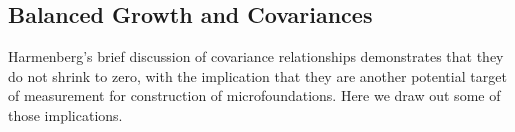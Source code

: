 \documentclass[BufferStockTheory]{subfiles}
\begin{document}
\hypertarget{Balanced-Growth-Of-Covariances}{}
\subsection{Balanced Growth and Covariances}\label{subsec:Covariances}

\begin{comment}
From the perspective of period $t$, %
\begin{align*}
\BLevBF_{t+1} & = \Mean[b_{t+1} \pLevBF_{t+1}]
\\              & = \PGro \Mean[\cRat_{t}(\Rfree/(\PGro\pShk_{t+1}))\pShk_{t+1}\pLevBF_{t}]
\\              & = \PGro \Mean[\cRat_{t}\Rnorm\pLevBF_{t}]
\\              & = \PGro \Mean[(\mRat_{t}-\cFunc(\mRat_{t}))\Rnorm\pLevBF_{t}]
\\              & = \PGro \Mean[(\bRat_{t}+\tShk_{t}-\cFunc(\bRat_{t}+\tShk_{t}))\Rnorm\pLevBF_{t}]
\end{align*}
\end{comment}

Harmenberg's brief discussion of covariance relationships demonstrates that they do not shrink to zero, with the implication
that they are another potential target of measurement for construction of microfoundations.  Here we draw out some of those
implications.
\end{document}
